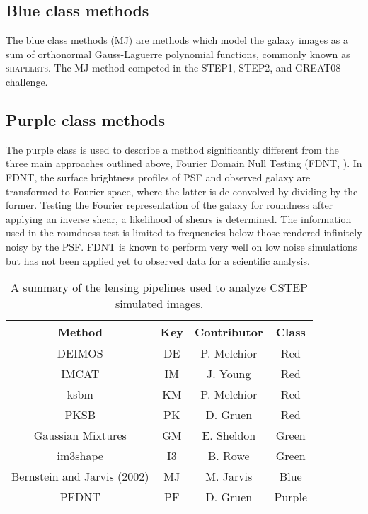 \subsection{Blue class methods}
The blue class methods (MJ) are methods which model the
galaxy images as a sum of orthonormal Gauss-Laguerre polynomial
functions, commonly known as \textsc{shapelets}. The MJ
method competed in the STEP1, STEP2, and GREAT08 challenge. 


\subsection{Purple class methods}
The purple class is used to describe a method significantly different from the
three main approaches outlined above, Fourier Domain Null Testing (FDNT,
\citealt{Bern}). In FDNT, the surface brightness profiles of PSF and
observed galaxy are transformed to Fourier space, where the latter is
de-convolved by dividing by the former. Testing the Fourier
representation of the galaxy for roundness after applying an inverse
shear, a likelihood of shears is determined. The information used in
the roundness test is limited to frequencies below those rendered
infinitely noisy by the PSF. FDNT is known to perform very well on low
noise simulations \citep{Bern} but has not been applied yet to
observed data for a scientific analysis.
 
\begin{table}
\begin{center}
  \begin{tabular}{| c | c | c| c | }
    \hline 
     Method & Key & Contributor & Class \\
    \hline
     DEIMOS & DE &  P. Melchior & Red  \\
    \hline
    IMCAT & IM & J. Young & Red  \\
    \hline
    ksbm &  KM & P. Melchior &  Red \\
    \hline
    PKSB & PK & D. Gruen & Red \\
    \hline
     Gaussian Mixtures & GM & E. Sheldon & Green \\
    \hline
     im3shape &  I3 &  B. Rowe & Green \\
    \hline
     Bernstein and Jarvis (2002) & MJ &  M. Jarvis & Blue \\
    \hline
     PFDNT &  PF & D. Gruen & Purple \\
    \hline
  \end{tabular}
\end{center}
\caption{ A summary of the lensing pipelines used to analyze CSTEP simulated images. }
\label{table:smp}
\end{table}
